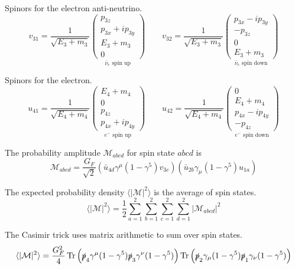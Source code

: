 Spinors for the electron anti-neutrino.
\begin{equation*}
v_{31}=\frac{1}{\sqrt{E_3+m_3}}
\underset{\text{$\bar{\nu}_e$ spin up}}
{\begin{pmatrix}p_{3z}\\p_{3x}+ip_{3y}\\E_3+m_3\\0\end{pmatrix}}
\qquad
v_{32}=\frac{1}{\sqrt{E_3+m_3}}
\underset{\text{$\bar{\nu}_e$ spin down}}
{\begin{pmatrix}p_{3x}-ip_{3y}\\-p_{3z}\\0\\E_3+m_3\end{pmatrix}}
\end{equation*}

Spinors for the electron.
\begin{equation*}
u_{41}=\frac{1}{\sqrt{E_4+m_4}}
\underset{\text{$e^-$ spin up}}
{\begin{pmatrix}E_4+m_4\\0\\p_{4z}\\p_{4x}+ip_{4y}\end{pmatrix}}
\qquad
u_{42}=\frac{1}{\sqrt{E_4+m_4}}
\underset{\text{$e^-$ spin down}}
{\begin{pmatrix}0\\E_4+m_4\\p_{4x}-ip_{4y}\\-p_{4z}\end{pmatrix}}
\end{equation*}

The probability amplitude $\mathcal{M}_{abcd}$ for spin state $abcd$ is
\begin{equation*}
\mathcal{M}_{abcd}=\frac{G_F}{\sqrt{2}}
\left(
\bar u_{4d}
\gamma^\mu(1-\gamma^5)
v_{3c}
\right)
\left(
\bar u_{2b}
\gamma_\mu(1-\gamma^5)
u_{1a}
\right)
\end{equation*}

The expected probability density $\langle|\mathcal{M}|^2\rangle$ is the average of spin states.
\begin{equation*}
\langle|\mathcal{M}|^2\rangle=
\frac{1}{2}
\sum_{a=1}^2\sum_{b=1}^2\sum_{c=1}^2\sum_{d=1}^2
|\mathcal{M}_{abcd}|^2
\end{equation*}

The Casimir trick uses matrix arithmetic to sum over spin states.
\begin{equation*}
\langle|\mathcal{M}|^2\rangle
=\frac{G_F^2}{4}
\mathop{\text{Tr}}
\left(\slashed{p}_4\gamma^\mu(1-\gamma^5)\slashed{p}_3\gamma^\nu(1-\gamma^5)\right)
\mathop{\text{Tr}}
\left(\slashed{p}_2\gamma_\mu(1-\gamma^5)\slashed{p}_1\gamma_\nu(1-\gamma^5)\right)
\end{equation*}

